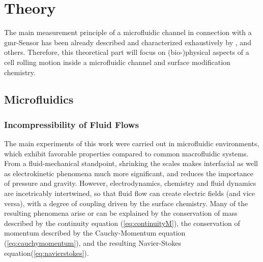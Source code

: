 \setcounter{page}{1}
\chapter{Theory}
The main measurement principle of a microfluidic channel in connection with a \gls{gmr}-Sensor has been already described and characterized exhaustively by \citet{lit:thes:helou}, \citet{lit:thes:reisbeck} and others.\cite{lit:thes:esthi,lit:thes:brenner} Therefore, this theoretical part will focus on (bio-)physical aspects of a cell rolling motion inside a microfluidic channel and surface modification chemistry.

\section{Microfluidics}

\subsection{Incompressibility of Fluid Flows}

The main experiments of this work were carried out in microfluidic environments, which exhibit favorable properties compared to common macrofluidic systems. From a fluid-mechanical standpoint, shrinking the scales makes interfacial as well as electrokinetic phenomena much more significant, and reduces the importance of pressure and gravity.\cite{lit:fluidic:kirby} However, electrodynamics, chemistry and fluid dynamics are incetricably intertwined, so that fluid flow can create electric fields (and vice versa), with a degree of coupling driven by the surface chemistry. Many of the resulting phenomena arise or can be explained by the conservation of mass described by the continuity equation (\cref{eq:continuityM}), the conservation of momentum described by the Cauchy-Momentum equation (\cref{eq:cauchymomentum}), and the resulting Navier-Stokes equation(\cref{eq:navierstokes}).

